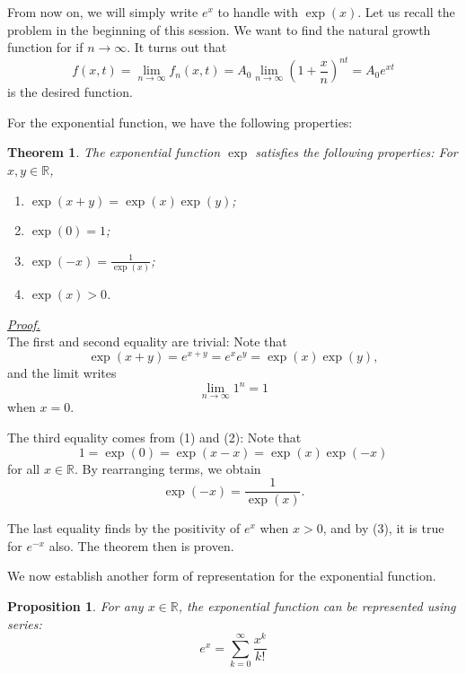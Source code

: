 \documentclass[12pt]{article}
\newtheorem*{theorem}{Theorem}
\newtheorem*{proposition}{Proposition}
\renewenvironment{proof}[1][Proof]{\begin{snugshade*} \underline{\textit{{#1}.}}\\}{\hfill \qedsymbol \end{snugshade*}}
\begin{document}
    From now on, we will simply write $e^x$ to handle with $\exp(x)$. Let us recall the problem in the beginning of this session. We want to find the natural growth function for if $n\to\infty$. It turns out that \[f(x,t)=\lim_{n\to\infty}f_n(x,t)=A_0\lim_{n\to\infty}(1+\frac{x}{n})^{nt}=A_0 e^{xt}\] is the desired function.

    For the exponential function, we have the following properties:

    \begin{theorem}
        The exponential function $\exp$ satisfies the following properties: For $x,y\in\mathbb{R}$, \begin{enumerate}
            \item $\exp(x+y)=\exp(x)\exp(y)$;
            \item $\exp(0)=1$;
            \item $\displaystyle \exp(-x)=\frac{1}{\exp(x)}$;
            \item $\exp(x)>0$.
        \end{enumerate}
    \end{theorem}

    \begin{proof}
        The first and second equality are trivial: Note that \[\exp(x+y)=e^{x+y}=e^x e^y=\exp(x)\exp(y),\] and the limit writes \[\lim_{n\to \infty}1^n=1\] when $x=0$.

        The third equality comes from (1) and (2): Note that \[1=\exp(0)=\exp(x-x)=\exp(x)\exp(-x)\] for all $x\in\mathbb{R}$. By rearranging terms, we obtain \[\exp(-x)=\frac{1}{\exp(x)}.\]

        The last equality finds by the positivity of $e^x$ when $x>0$, and by (3), it is true for $e^{-x}$ also. The theorem then is proven.
    \end{proof}

    We now establish another form of representation for the exponential function.

    \begin{proposition}
        For any $x\in\mathbb{R}$, the exponential function can be represented using series: \[e^x=\sum_{k=0}^{\infty}\frac{x^k}{k!}\]
    \end{proposition}
\end{document}

